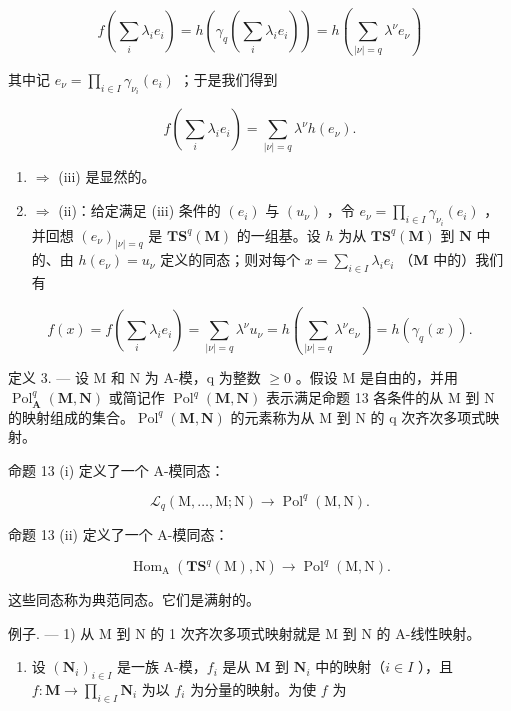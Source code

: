 \[
f \left(\sum_ {i} \lambda_ {i} e _ {i}\right) = h \left(\gamma_ {q} \left(\sum_ {i} \lambda_ {i} e _ {i}\right)\right) = h \left(\sum_ {| \nu | = q} \lambda^ {\nu} e _ {\nu}\right)
\]

其中记 \(e_{\nu} = \prod_{i\in I}\gamma_{\nu_i}(e_i)\) ；于是我们得到

\[
f \left(\sum_ {i} \lambda_ {i} e _ {i}\right) = \sum_ {| \nu | = q} \lambda^ {\nu} h \left(e _ {\nu}\right).
\]

\begin{enumerate}
\def\labelenumi{(\roman{enumi})}
\setcounter{enumi}{3}
\item
  \(\Rightarrow\) (iii) 是显然的。
\item
  \(\Rightarrow\) (ii)：给定满足 (iii) 条件的 \((e_i)\) 与 \((u_\nu)\) ，令 \(e_\nu = \prod_{i\in I}\gamma_{\nu_i}(e_i)\) ，并回想 \((e_\nu)_{|\nu| = q}\) 是 \(\mathbf{TS}^q (\mathbf{M})\) 的一组基。设 \(h\) 为从 \(\mathbf{TS}^q (\mathbf{M})\) 到 \(\mathbf{N}\) 中的、由 \(h(e_{\nu}) = u_{\nu}\) 定义的同态；则对每个 \(x = \sum_{i\in I}\lambda_i e_i\) （\(\mathbf{M}\) 中的）我们有
\end{enumerate}

\[
f (x) = f \left(\sum_ {i} \lambda_ {i} e _ {i}\right) = \sum_ {| \nu | = q} \lambda^ {\nu} u _ {\nu} = h \left(\sum_ {| \nu | = q} \lambda^ {\nu} e _ {\nu}\right) = h (\gamma_ {q} (x)).
\]

定义 3. --- 设 M 和 N 为 A-模，q 为整数 \(\geqslant 0\) 。假设 M 是自由的，并用 \(\operatorname{Pol}_{\mathbf{A}}^{q}(\mathbf{M}, \mathbf{N})\) 或简记作 \(\operatorname{Pol}^{q}(\mathbf{M}, \mathbf{N})\) 表示满足命题 13 各条件的从 M 到 N 的映射组成的集合。\(\operatorname{Pol}^{q}(\mathbf{M}, \mathbf{N})\) 的元素称为从 M 到 N 的 q 次齐次多项式映射。

命题 13 (i) 定义了一个 A-模同态：

\[
\mathcal {L} _ {q} (\mathrm{M}, \dots , \mathrm{M}; \mathrm{N}) \rightarrow \operatorname{Pol} ^ {q} (\mathrm{M}, \mathrm{N}).
\]

命题 13 (ii) 定义了一个 A-模同态：

\[
\operatorname{Hom} _ {\mathrm{A}} \left(\mathbf {T S} ^ {q} (\mathrm{M}), \mathrm{N}\right)\rightarrow \operatorname{Pol} ^ {q} (\mathrm{M}, \mathrm{N}).
\]

这些同态称为典范同态。它们是满射的。

例子. --- 1) 从 M 到 N 的 1 次齐次多项式映射就是 M 到 N 的 A-线性映射。

\begin{enumerate}
\def\labelenumi{\arabic{enumi})}
\setcounter{enumi}{1}
\tightlist
\item
  设 \((\mathbf{N}_i)_{i\in I}\) 是一族 A-模，\(f_{i}\) 是从 \(\mathbf{M}\) 到 \(\mathbf{N}_i\) 中的映射（\(i\in I\) ），且 \(f:\mathbf{M}\to \prod_{i\in I}\mathbf{N}_i\) 为以 \(f_{i}\) 为分量的映射。为使 \(f\) 为
\end{enumerate}

